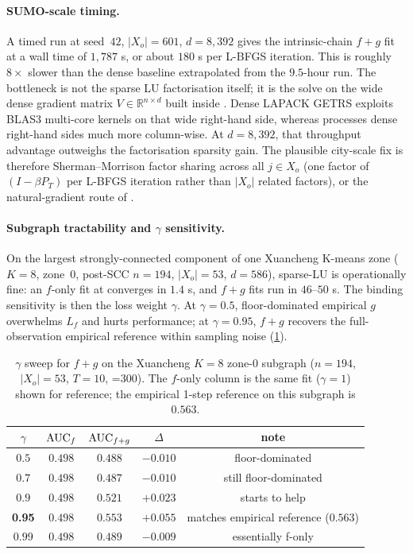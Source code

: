 \paragraph{SUMO-scale timing.} A timed run at seed~$42$, $|X_o|=601$,
$d=8{,}392$ gives the intrinsic-chain $f+g$ fit at 
a wall time of $1{,}787$ s, or about $180$ s per L-BFGS iteration. This is
roughly $8\times$ slower than the dense baseline extrapolated from the
$9.5$-hour run. The bottleneck is not the sparse LU factorisation itself;
it is the solve on the wide dense gradient matrix
$V\in\mathbb{R}^{n\times d}$ built inside . Dense
LAPACK GETRS exploits BLAS3 multi-core kernels on that wide right-hand
side, whereas  processes dense right-hand sides much more
column-wise. At $d=8{,}392$, that throughput advantage outweighs the
factorisation sparsity gain. The plausible city-scale fix is therefore
Sherman--Morrison factor sharing across all $j\in X_o$ (one factor of
$(I-\beta P_T)$ per L-BFGS iteration rather than $|X_o|$ related factors),
or the natural-gradient route of \cite{morimura2013}.

\paragraph{Subgraph tractability and $\gamma$ sensitivity.} On the
largest strongly-connected component of one Xuancheng K-means zone
($K=8$, zone~$0$, post-SCC $n=194$, $|X_o|=53$, $d=586$), sparse-LU is
operationally fine: an $f$-only fit at  converges in
$1.4$ s, and $f+g$ fits run in $46$--$50$ s. The binding sensitivity is
then the loss weight $\gamma$. At $\gamma=0.5$, floor-dominated empirical
$g$ overwhelms $L_f$ and hurts performance; at $\gamma=0.95$, $f+g$
recovers the full-observation empirical reference within sampling noise
(\cref{tab:phase4-fg-gamma}).

\begin{table}[H]
\centering
\caption{$\gamma$ sweep for $f+g$ on the Xuancheng $K=8$ zone-0 subgraph
($n=194$, $|X_o|=53$, $T=10$, =300). The $f$-only column is
the same fit ($\gamma=1$) shown for reference; the empirical 1-step
reference on this subgraph is $0.563$.}
\label{tab:phase4-fg-gamma}
\small
\begin{tabular}{ccccc}
\toprule
$\gamma$ & $\mathrm{AUC}_f$ & $\mathrm{AUC}_{f+g}$ & $\Delta$ & note \\
\midrule
$0.5$  & $0.498$ & $0.488$ & $-0.010$ & floor-dominated \\
$0.7$  & $0.498$ & $0.487$ & $-0.010$ & still floor-dominated \\
$0.9$  & $0.498$ & $0.521$ & $+0.023$ & starts to help \\
\textbf{0.95} & $0.498$ & $\mathbf{0.553}$ & $\mathbf{+0.055}$ & matches empirical reference ($0.563$) \\
$0.99$ & $0.498$ & $0.489$ & $-0.009$ & essentially f-only \\
\bottomrule
\end{tabular}
\end{table}

